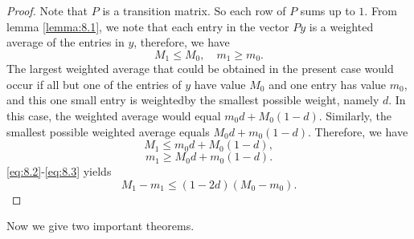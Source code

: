 \begin{proof}
Note that $P$ is a transition matrix. So each row of $P$ sums up to $1$. From lemma \ref{lemma:8.1}, we note that each entry in the vector $Py$ is a weighted average of the entries in $y$, therefore, we have
$$$$$$$$$$\begin{equation}
    \label{eq:8.1}
    \tag{8-1}
    M_1 \leq M_0, \quad m_1 \geq m_0.
\end{equation}$$$$$$$$$$
The largest weighted average that could be obtained in the present case would occur if all but one of the entries of $y$ have value $M_0$ and one entry has value $m_0$, and this one small entry is weightedby the smallest possible weight, namely $d$. In this case, the weighted average would equal $m_0 d + M_0(1-d)$.
Similarly, the smallest possible weighted average equals $M_0 d + m_0(1-d)$.
Therefore, we have 
$$$$$$$$$$\begin{equation}
    \label{eq:8.2}
    \tag{8-2}
    M_1 \leq m_0 d + M_0(1-d),
\end{equation}$$$$$$$$$$
$$$$$$$$$$\begin{equation}
    \label{eq:8.3}
    \tag{8-3}
    m_1 \geq M_0 d + m_0(1-d). 
\end{equation}$$$$$$$$$$
\eqref{eq:8.2}-\eqref{eq:8.3} yields 
$$\begin{equation}
    M_1 - m_1 \leq (1-2d) (M_0 - m_0).
\end{equation}$$
\end{proof}

Now we give two important theorems.

